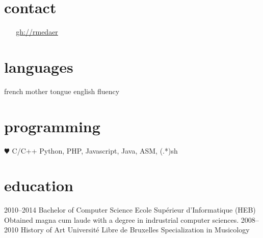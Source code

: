 \documentclass[]{friggeri-cv} %
\begin{document}





\begin{aside} %
\section{contact}
\myAddress
~
\myPhoneNumber
~
\href{mailto:\myPrivateMail}{\myPrivateMail}
\href{http://github.com/rmedaer}{gh://rmedaer}
\section{languages}
french mother tongue
english fluency
\section{programming}
{\color{red} $\varheartsuit$} C/C++
Python, PHP, Javascript,
Java, ASM, (.*)sh
\end{aside}


\section{education}

\begin{entrylist}
\entry
{2010--2014}
{Bachelor {\normalfont of Computer Science}}
{Ecole Supérieur d'Informatique (HEB)}
{Obtained magna cum laude with a degree in indrustrial computer sciences.}
\entry
{2008--2010}
{{\normalfont History of Art}}
{Université Libre de Bruxelles}
{Specialization in Musicology}
\end{entrylist}
\end{document}
